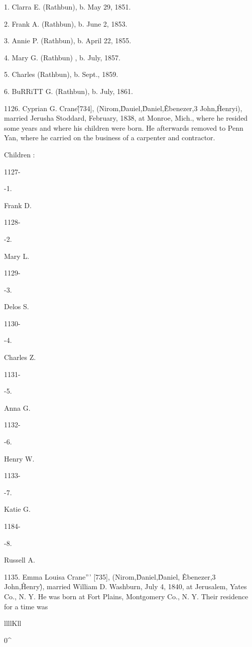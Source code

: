 \documentclass{book}
\begin{document}
1. Clarra E. (Rathbun), b. May 29, 1851. 

2. Frank A. (Rathbun), b. June 2, 1853. 

3. Annie P. (Rathbun), b. April 22, 1855. 

4. Mary G. (Rathbun) , b. July, 1857. 

5. Charles (Rathbun), b. Sept., 1859. 

6. BuRRiTT G. (Rathbun), b. July, 1861. 

1126. Cyprian G. Crane\^ [734], (Nirom,\^ Dauiel,\^ Daniel,\^ 
Ebenezer,3 John,\^ Henryi), married Jerusha Stoddard, February, 
1838, at Monroe, Mich., where he resided some years and where 
his children were born. He afterwards removed to Penn Yan, 
where he carried on the business of a carpenter and contractor. 

Children : 



1127- 


-1. 


Frank D. 


1128- 


-2. 


Mary L. 


1129- 


-3. 


Delos S. 


1130- 


-4. 


Charles Z. 


1131- 


-5. 


Anna G. 


1132- 


-6. 


Henry W. 


1133- 


-7. 


Katie G. 


1184- 


-8. 


Russell A. 



1135. Emma Louisa Crane''' [735], (Nirom,\^ Daniel,\^ Daniel, \^ 
Ebenezer,3 John,\^ Henry\^), married William D. Washburn, July 
4, 1840, at Jerusalem, Yates Co., N. Y. He was born at Fort 
Plains, Montgomery Co., N. Y. Their residence for a time was 



llllKll 



0\^ 
\end{document}
